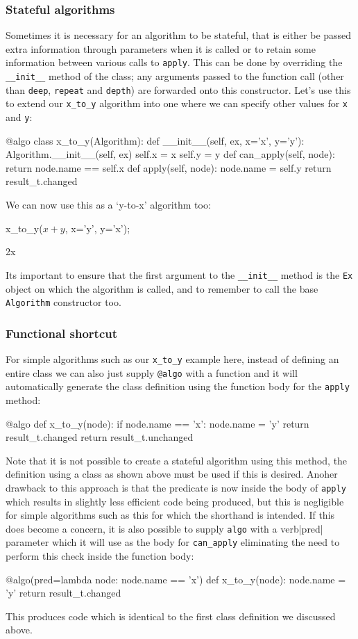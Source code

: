 \documentclass{article}
\begin{document}
\subsubsection*{Stateful algorithms}
Sometimes it is necessary for an algorithm to be stateful, that is either be passed extra information through parameters when
it is called or to retain some information between various calls to \verb|apply|. This can be done by overriding the 
\verb|__init__| method of the class; any arguments passed to the function call (other than \verb|deep|, \verb|repeat| and
\verb|depth|) are forwarded onto this constructor.  Let's use this to extend our \verb|x_to_y| algorithm into one where we can
specify other values for \verb|x| and \verb|y|:
\begin{lstcdb}
	@algo
	class x_to_y(Algorithm):
		def __init__(self, ex, x='x', y='y'):
			Algorithm.__init__(self, ex)
			self.x = x
			self.y = y
		def can_apply(self, node):
			return node.name == self.x
		def apply(self, node):
			node.name = self.y
			return result_t.changed
\end{lstcdb}
We can now use this as a `y-to-x' algorithm too:
\begin{lstcdb}
	x_to_y($x + y$, x='y', y='x');
\end{lstcdb}
\begin{lstverb}
	2x
\end{lstverb}
Its important to ensure that the first argument to the \verb|__init__| method is the \verb|Ex| object on which the algorithm
is called, and to remember to call the base \verb|Algorithm| constructor too.

\subsubsection*{Functional shortcut}
For simple algorithms such as our \verb|x_to_y| example here, instead of defining an entire class we can also just supply
\verb|@algo| with a function and it will automatically generate the class definition using the function body for the
\verb|apply| method:
\begin{lstcdb}
	@algo
	def x_to_y(node):
		if node.name == 'x':
			node.name = 'y'
			return result_t.changed
		return result_t.unchanged
\end{lstcdb}
Note that it is not possible to create a stateful algorithm using this method, the definition using a class as shown above must
be used if this is desired.
Anoher drawback to this approach is that the predicate is now inside the body of \verb|apply| which results in slightly less
efficient code being produced, but this is negligible for simple algorithms such as this for which the shorthand is intended.
If this does become a concern, it is also possible to supply \verb|algo| with a verb|pred| parameter which it will use as the
body for \verb|can_apply| eliminating the need to perform this check inside the function body:
\begin{lstcdb}
	@algo(pred=lambda node: node.name == 'x')
	def x_to_y(node):
		node.name = 'y'
		return result_t.changed
\end{lstcdb}
This produces code which is identical to the first class definition we discussed above. 
\end{document}
